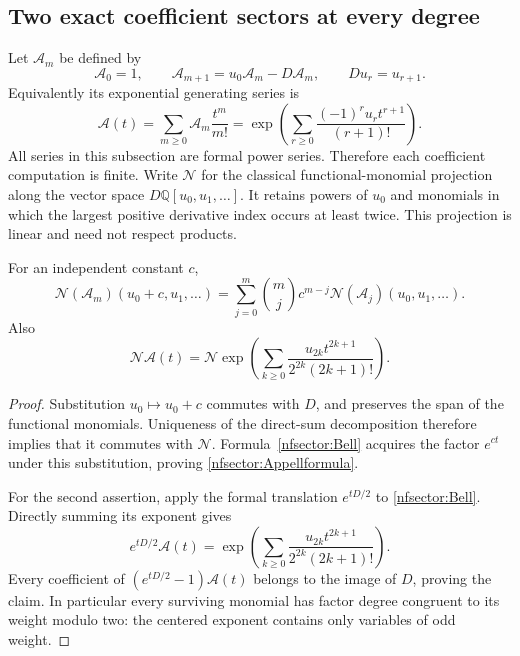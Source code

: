 \subsection{Two exact coefficient sectors at every degree}
\label{nfsector:section}

Let $\mathcal A_m$ be defined by
\[
 \mathcal A_0=1,\qquad
 \mathcal A_{m+1}=u_0\mathcal A_m-D\mathcal A_m,
 \qquad D u_r=u_{r+1}.
\]
Equivalently its exponential generating series is
\begin{equation}\label{nfsector:Bell}
 \mathcal A(t)=\sum_{m\ge0}\mathcal A_m\frac{t^m}{m!}
 =\exp\left(\sum_{r\ge0}
       \frac{(-1)^r u_r t^{r+1}}{(r+1)!}\right).
\end{equation}
All series in this subsection are formal power series.  Therefore each
coefficient computation is finite.  Write $\mathcal N$ for the classical
functional-monomial projection along the vector space $D\mathbb Q[u_0,u_1,\ldots]$.
It retains powers of $u_0$ and monomials in which the largest positive
derivative index occurs at least twice.  This projection is linear and
need not respect products.

\begin{lemma}\label{nfsector:Appell}
For an independent constant $c$,
\begin{equation}\label{nfsector:Appellformula}
 \mathcal N(\mathcal A_m)(u_0+c,u_1,\ldots)
 =\sum_{j=0}^m\binom mj c^{m-j}\mathcal N(\mathcal A_j)(u_0,u_1,\ldots).
\end{equation}
Also
\begin{equation}\label{nfsector:centered}
 \mathcal N\mathcal A(t)
 =\mathcal N\exp\left(\sum_{k\ge0}
       \frac{u_{2k}t^{2k+1}}{2^{2k}(2k+1)!}\right).
\end{equation}
\end{lemma}
\begin{proof}
Substitution $u_0\mapsto u_0+c$ commutes with $D$, and preserves the
span of the functional monomials.  Uniqueness of the direct-sum
decomposition therefore implies that it commutes with $\mathcal N$.
Formula~\eqref{nfsector:Bell} acquires the factor $e^{ct}$ under this
substitution, proving \eqref{nfsector:Appellformula}.

For the second assertion, apply the formal translation $e^{tD/2}$
to \eqref{nfsector:Bell}.  Directly summing its exponent gives
\[
 e^{tD/2}\mathcal A(t)
 =\exp\left(\sum_{k\ge0}
       \frac{u_{2k}t^{2k+1}}{2^{2k}(2k+1)!}\right).
\]
Every coefficient of $(e^{tD/2}-1)\mathcal A(t)$ belongs to the image
of $D$, proving the claim.  In particular every surviving monomial
has factor degree congruent to its weight modulo two: the centered
exponent contains only variables of odd weight.
\end{proof}


